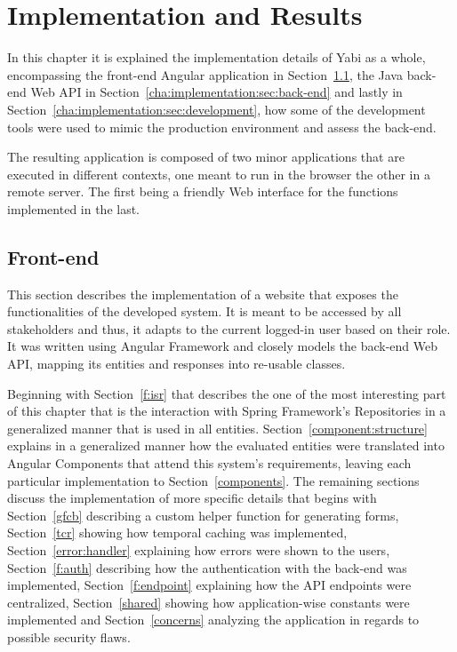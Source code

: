 \chapter{Implementation and Results}\label{cha:implementation}
In this chapter it is explained the implementation details of \gls{Yabi} as a whole, encompassing the front-end Angular application in Section~\ref{cha:implementation:sec:front-end}, the Java back-end Web \gls{API} in Section~\ref{cha:implementation:sec:back-end} and lastly in Section~\ref{cha:implementation:sec:development}, how some of the development tools were used to mimic the production environment and assess the back-end.

The resulting application is composed of two minor applications that are executed in different contexts, one meant to run in the browser the other in a remote server. The first being a friendly Web interface for the functions implemented in the last.

\section{Front-end}\label{cha:implementation:sec:front-end}
This section describes the implementation of a website that exposes the functionalities of the developed system. It is meant to be accessed by all stakeholders and thus, it adapts to the current logged-in user based on their role. It was written using Angular Framework and closely models the back-end Web \gls{API}, mapping its entities and responses into re-usable classes.

Beginning with Section~\ref{f:isr} that describes the one of the most interesting part of this chapter that is the interaction with Spring Framework's Repositories in a generalized manner that is used in all entities. Section~\ref{component:structure} explains in a generalized manner how the evaluated entities were translated into Angular Components that attend this system's requirements, leaving each particular implementation to Section~\ref{components}. The remaining sections discuss the implementation of more specific details that begins with Section~\ref{gfcb} describing a custom helper function for generating forms, Section~\ref{tcr} showing how temporal caching was implemented, Section~\ref{error:handler} explaining how errors were shown to the users, Section~\ref{f:auth} describing how the authentication with the back-end was implemented, Section~\ref{f:endpoint} explaining how the \gls{API} endpoints were centralized, Section~\ref{shared} showing how application-wise constants were implemented and Section~\ref{concerns} analyzing the application in regards to possible security flaws.

